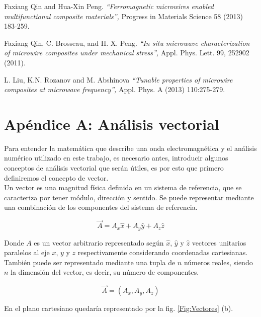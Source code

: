 \documentclass[12pt,letterpaper]{article}
\numberwithin{equation}{section}
\begin{document}
\begin{thebibliography}{9}
	Faxiang Qin and Hua-Xin Peng.
	\textit{``Ferromagnetic microwires enabled multifunctional composite materials'',} 
	Progress in Materials Science 58 (2013) 183-259.		

	Faxiang Qin, C. Brosseau, and H. X. Peng.
	\textit{``In situ microwave characterization of microwire composites under mechanical stress'',} 
	Appl. Phys. Lett. 99, 252902 (2011).
	
	L. Liu, K.N. Rozanov and M. Abshinova
	\textit{``Tunable properties of microwire composites at microwave frequency'',} 
	Appl. Phys. A (2013) 110:275-279.		

\end{thebibliography}

\pagebreak
\part*{Apéndice A: Análisis vectorial}
\setcounter{figure}{0}

Para entender la matemática que describe una onda electromagnética y el análisis numérico utilizado en este trabajo, es necesario antes, introducir algunos conceptos de análisis vectorial que serán útiles, es por esto que primero definiremos el concepto de vector.\\

\noindent Un vector es una magnitud física definida en un sistema de referencia, que se caracteriza por tener módulo, dirección y sentido. Se puede representar mediante una combinación de los componentes del sistema de referencia.

$$\vec{A}=A_x\hat{x}+A_y\hat{y}+A_z\hat{z}$$

\noindent Donde $A$ es un vector arbitrario representado según  $\hat{x}$, $\hat{y}$ y $\hat{z}$ vectores unitarios paralelos al eje $x$, $y$ y $z$ respectivamente considerando coordenadas cartesianas. También puede ser representado mediante una tupla de $n$ números reales, siendo $n$ la dimensión del vector, es decir, su número de componentes.

$$\vec{A}=(A_x,A_y,A_z)$$

\noindent En el plano cartesiano quedaría representado por la fig. \ref{Fig:Vectores} (b). 
\end{document}
